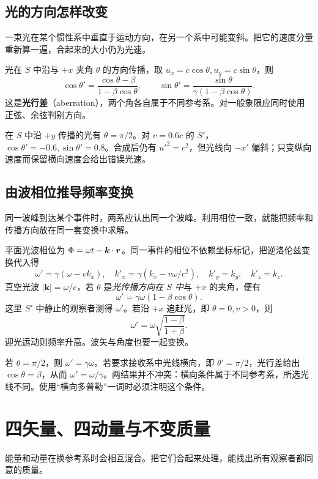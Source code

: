 \subsection{光的方向怎样改变}
一束光在某个惯性系中垂直于运动方向，在另一个系中可能变斜。把它的速度分量重新算一遍，合起来的大小仍为光速。

光在 $S$ 中沿与 $+x$ 夹角 $\theta$ 的方向传播，取 $u_x=c\cos\theta,u_y=c\sin\theta$，则
\[
\cos\theta'=\frac{\cos\theta-\beta}{1-\beta\cos\theta},\qquad
\sin\theta'=\frac{\sin\theta}{\gamma(1-\beta\cos\theta)}.
\]
这是\textbf{光行差}（aberration），两个角各自属于不同参考系。对一般象限应同时使用正弦、余弦判别方向。
\begin{example}[横向光并非在另一系仍横向]
在 $S$ 中沿 $+y$ 传播的光有 $\theta=\pi/2$。对 $v=0.6c$ 的 $S'$，$\cos\theta'=-0.6,\sin\theta'=0.8$。合成后仍有 $u'^2=c^2$，但光线向 $-x'$ 偏斜；只变纵向速度而保留横向速度会给出错误光速。
\end{example}

\subsection{由波相位推导频率变换}
同一波峰到达某个事件时，两系应认出同一个波峰。利用相位一致，就能把频率和传播方向放在同一套变换中求解。

平面光波相位为 $\Phi=\omega t-\boldsymbol{k}\cdot\boldsymbol{r}$。同一事件的相位不依赖坐标标记，把逆洛伦兹变换代入得
\[
\omega'=\gamma(\omega-vk_x),\quad
k'_x=\gamma(k_x-v\omega/c^2),\quad k'_y=k_y,\quad k'_z=k_z.
\]
真空光波 $|\boldsymbol{k}|=\omega/c$，若 $\theta$ 是\emph{光传播方向在 $S$ 中}与 $+x$ 的夹角，便有
\begin{equation}\label{eq:sr-doppler}
\boxed{\omega'=\gamma\omega(1-\beta\cos\theta).}
\end{equation}
这里 $S'$ 中静止的观察者测得 $\omega'$。若沿 $+x$ 追赶光，即 $\theta=0,v>0$，则
\[
\omega'=\omega\sqrt{\frac{1-\beta}{1+\beta}}.
\]
迎光运动则频率升高。波矢与角度也要一起变换。
\begin{example}[两种“横向”条件]
若 $\theta=\pi/2$，则 $\omega'=\gamma\omega$。若要求接收系中光线横向，即 $\theta'=\pi/2$，光行差给出 $\cos\theta=\beta$，从而 $\omega'=\omega/\gamma$。两结果并不冲突：横向条件属于不同参考系，所选光线不同。使用“横向多普勒”一词时必须注明这个条件。
\end{example}

\section{四矢量、四动量与不变质量}
能量和动量在换参考系时会相互混合。把它们合起来处理，能找出所有观察者都同意的质量。

